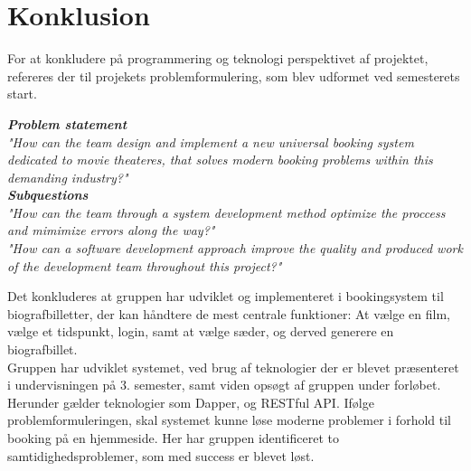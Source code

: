 \chapter{Konklusion}\label{ch:konklusion}
For at konkludere på programmering og teknologi perspektivet af projektet, refereres der til projekets problemformulering,
som blev udformet ved semesterets start.

\begin{center}
\textit{\textbf{Problem statement} \\
"How can the team design and implement a new universal booking system dedicated to movie theateres, 
that solves modern booking problems within this demanding industry?"} \\

\textit{\textbf{Subquestions}\\
"How can the team through a system development method optimize the proccess and mimimize errors along the way?"}\\

\textit{"How can a software development approach improve the quality and 
produced work of the development team throughout this project?"}\\
\end{center} 

Det konkluderes at gruppen har udviklet og implementeret i bookingsystem til biografbilletter, der kan håndtere de 
mest centrale funktioner: At vælge en film, vælge et tidspunkt, login, samt at vælge sæder, og derved generere en 
biografbillet. \\


Gruppen har udviklet systemet, ved brug af teknologier der er blevet præsenteret i undervisningen på 3. semester, 
samt viden opsøgt af gruppen under forløbet. 
Herunder gælder teknologier som Dapper, og RESTful API. Ifølge problemformuleringen, skal systemet kunne løse 
moderne problemer i forhold til booking på en hjemmeside. Her har gruppen identificeret to samtidighedsproblemer, som med success er blevet løst. \\


